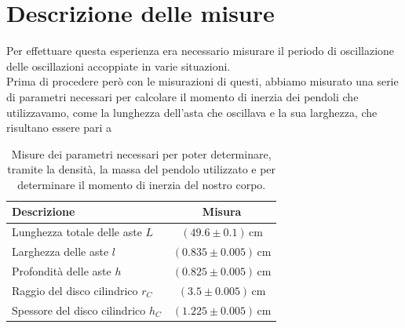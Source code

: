 \documentclass{article}
\begin{document}
\section{Descrizione delle misure}

Per effettuare questa esperienza era necessario misurare il periodo di oscillazione delle oscillazioni accoppiate in varie situazioni. \\
Prima di procedere però con le misurazioni di questi, abbiamo misurato una serie di parametri necessari per calcolare il momento di inerzia dei pendoli che utilizzavamo, come la lunghezza dell'asta che oscillava e la sua larghezza, che risultano essere pari a
\begin{table}[H]
\centering
\begin{tabular}{l c}
	Descrizione & Misura \\ \midrule	Lunghezza totale delle aste $L$ & $(49.6 \pm 0.1) \, \si{\centi\meter}$ \\ \midrule
	Larghezza delle aste $l$ & $(0.835 \pm 0.005) \, \si{\centi\meter}$ \\ \midrule
	Profondità delle aste $h$ & $(0.825 \pm 0.005) \, \si{\centi\meter}$ \\ \midrule
	Raggio del disco cilindrico $r_C$ & $(3.5 \pm 0.005) \, \si{\centi\meter}$ \\ \midrule
	Spessore del disco cilindrico $h_C$ & $(1.225 \pm 0.005) \, \si{\centi\meter}$  \\ \bottomrule
\end{tabular}
\caption{Misure dei parametri necessari per poter determinare, tramite la densità, la massa del pendolo utilizzato e per determinare il momento di inerzia del nostro corpo.}
\end{table}
\end{document}
